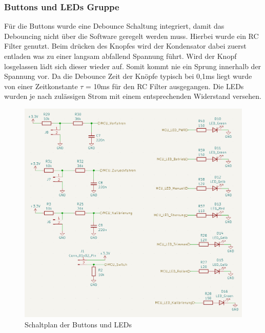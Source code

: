 \subsubsection{Buttons und LEDs Gruppe}
Für die Buttons wurde eine Debounce Schaltung integriert, damit das Debouncing nicht über die Software geregelt werden muss. Hierbei wurde ein RC Filter genutzt. Beim drücken des Knopfes wird der Kondensator dabei zuerst entladen was zu einer langsam abfallend Spannung führt. Wird der Knopf losgelassen lädt sich dieser wieder auf. Somit kommt nie ein Sprung innerhalb der Spannung vor. Da die Debounce Zeit der Knöpfe typisch bei 0,1ms liegt wurde von einer Zeitkonstante $\tau$ = 10ms für den RC Filter ausgegangen. Die \ac{LED}s wurden je nach zulässigen Strom mit einem entsprechenden Widerstand versehen.
\begin{figure}[H]
	\centering
	\includegraphics[width=1.0\textwidth]{images/Hardware/LEDS_und_buttons_schaltplan.PNG}
	\caption{Schaltplan der Buttons und LEDs}
	\label{fig:HMI_Gruppe}
\end{figure}
